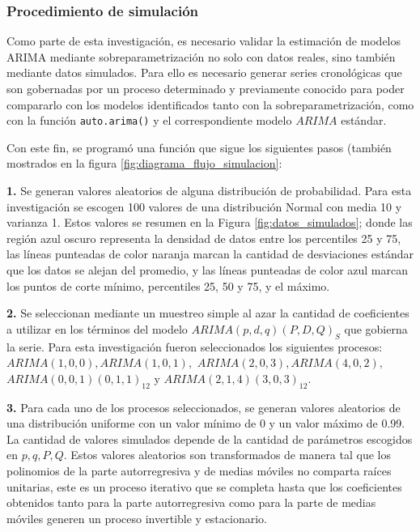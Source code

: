 \documentclass[
]{article}
\begin{document}
\subsubsection{Procedimiento de simulación}

Como parte de esta investigación, es necesario validar la estimación de
modelos ARIMA mediante sobreparametrización no solo con datos reales,
sino también mediante datos simulados. Para ello es necesario generar
series cronológicas que son gobernadas por un proceso determinado y
previamente conocido para poder compararlo con los modelos identificados
tanto con la sobreparametrización, como con la función
\texttt{auto.arima()} y el correspondiente modelo \(ARIMA\) estándar.

Con este fin, se programó una función que sigue los siguientes pasos
(también mostrados en la figura \ref{fig:diagrama_flujo_simulacion}:

\textbf{1.} Se generan valores aleatorios de alguna distribución de
probabilidad. Para esta investigación se escogen 100 valores de una
distribución Normal con media 10 y varianza 1. Estos valores se resumen
en la Figura \ref{fig:datos_simulados}; donde las región azul oscuro
representa la densidad de datos entre los percentiles 25 y 75, las
líneas punteadas de color naranja marcan la cantidad de desviaciones
estándar que los datos se alejan del promedio, y las líneas punteadas de
color azul marcan los puntos de corte mínimo, percentiles 25, 50 y 75, y
el máximo.

\textbf{2.} Se seleccionan mediante un muestreo simple al azar la
cantidad de coeficientes a utilizar en los términos del modelo
\(ARIMA(p,d,q)(P,D,Q)_S\) que gobierna la serie. Para esta investigación
fueron seleccionados los siguientes procesos:
\(ARIMA(1,0,0), ARIMA(1,0,1),\) \(ARIMA(2,0,3), ARIMA(4,0,2),\)
\(ARIMA(0,0,1)(0,1,1)_{12}\) y \(ARIMA(2,1,4)(3,0,3)_{12}\).

\textbf{3.} Para cada uno de los procesos seleccionados, se generan
valores aleatorios de una distribución uniforme con un valor mínimo de 0
y un valor máximo de 0.99. La cantidad de valores simulados depende de
la cantidad de parámetros escogidos en \(p, q, P, Q\). Estos valores
aleatorios son transformados de manera tal que los polinomios de la
parte autorregresiva y de medias móviles no comparta raíces unitarias,
este es un proceso iterativo que se completa hasta que los coeficientes
obtenidos tanto para la parte autorregresiva como para la parte de
medias móviles generen un proceso invertible y estacionario.
\end{document}
